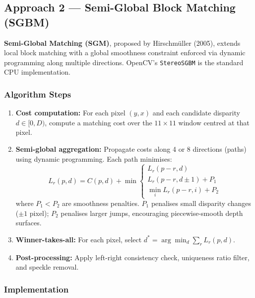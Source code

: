 \documentclass[12pt, a4paper]{article}
\newcommand{\code}[1]{\texttt{\small#1}}
\begin{document}
\subsection{Approach 2 --- Semi-Global Block Matching (SGBM)}

\textbf{Semi-Global Matching (SGM)}, proposed by Hirschmüller (2005), extends
local block matching with a global smoothness constraint enforced via dynamic
programming along multiple directions. OpenCV's \code{StereoSGBM} is the
standard CPU implementation.

\subsubsection{Algorithm Steps}

\begin{enumerate}
  \item \textbf{Cost computation:} For each pixel $(y, x)$ and each candidate
        disparity $d \in [0, D)$, compute a matching cost over the $11 \times 11$
        window centred at that pixel.

  \item \textbf{Semi-global aggregation:} Propagate costs along 4 or 8
        directions (paths) using dynamic programming. Each path minimises:
        \begin{equation}
          L_r(p, d) = C(p, d) + \min\begin{cases}
            L_r(p-r, d) \\
            L_r(p-r, d \pm 1) + P_1 \\
            \min_i L_r(p-r, i) + P_2
          \end{cases}
        \end{equation}
        where $P_1 < P_2$ are smoothness penalties. $P_1$ penalises small
        disparity changes ($\pm 1$ pixel); $P_2$ penalises larger jumps,
        encouraging piecewise-smooth depth surfaces.

  \item \textbf{Winner-takes-all:} For each pixel, select $d^* =
        \arg\min_d \sum_r L_r(p, d)$.

  \item \textbf{Post-processing:} Apply left-right consistency check,
        uniqueness ratio filter, and speckle removal.
\end{enumerate}

\subsubsection{Implementation}
\end{document}
